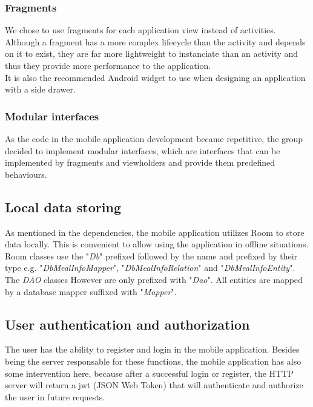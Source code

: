 \subsubsection{Fragments}

We chose to use fragments\cite{fragment} for each application view instead of activities. Although a fragment has a more complex lifecycle than the activity and depends on it
to exist, they are far more lightweight to instanciate than an activity and thus they provide more performance to the application.\\ 

It is also the recommended Android widget to use when designing an application with a side drawer.\\

\subsubsection{Modular interfaces}

As the code in the mobile application development became repetitive, the group decided to implement modular interfaces,
which are interfaces that can be implemented by fragments and viewholders and provide them predefined behaviours.

\subsection{Local data storing}

As mentioned in the dependencies, the mobile application utilizes Room to store data locally. This is convenient
to allow using the application in offline situations.\\

Room classes use the "\textit{Db}" prefixed followed by the name and prefixed by their type e.g. "\textit{DbMealInfoMapper}", "\textit{DbMealInfoRelation}" and "\textit{DbMealInfoEntity}". 
The \textit{DAO} classes However are only prefixed with "\textit{Dao}". 
All entities are mapped by a database mapper suffixed with "\textit{Mapper}".

\subsection{User authentication and authorization}

The user has the ability to register and login in the mobile application. Besides being the server responsable for these functions, the mobile application has also some intervention
here, because after a successful login or register, the HTTP server will return a jwt (JSON Web Token) that will authenticate and authorize the user in future requests.\\

